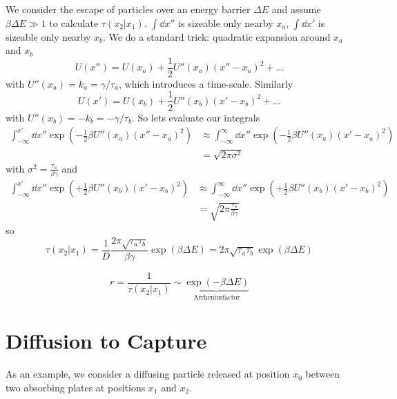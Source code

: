 \documentclass{notebook}
\begin{document}
We consider the escape of particles over an energy barrier $\Delta E$ and assume $\beta \Delta E \gg 1$ to calculate $\tau(x_2|x_1)$. $\int \dd{x''}$ is sizeable only nearby $x_a$, $\int \dd{x'}$ is sizeable only nearby $x_b$. We do a standard trick: quadratic expansion around $x_a$ and $x_b$
%
\begin{equation}
U(x'') = U(x_a) + \frac{1}{2} U''(x_a) (x''-x_a)^2 + \dots
\end{equation}
%
with $U''(x_a) = k_a = \gamma/\tau_a$, which introduces a time-scale. Similarly
%
\begin{equation}
U(x') = U(x_b) + \frac{1}{2} U''(x_b) (x'-x_b)^2 + \dots
\end{equation}
%
with $U''(x_b) = -k_b = -\gamma/\tau_b$. So lets evaluate our integrals
%
\begin{align*}
	\int_{-\infty}^{x'} \dd{x''} \exp(-  \frac{1}{2} \beta U''(x_a) (x''-x_a)^2)
	&\approx \int_{-\infty}^{\infty} \dd{x''} \exp(-  \frac{1}{2} \beta U''(x_a) (x'-x_a)^2) \\ 
	&= \sqrt{2 \pi \sigma^2}
\end{align*}
%
with $\sigma^2 = \frac{\tau_a}{\beta \gamma}$ and
%
\begin{align*}
	\int_{-\infty}^{x'} \dd{x''} \exp(+\frac{1}{2} \beta U''(x_b) (x'-x_b)^2)
	&\approx \int_{-\infty}^{\infty} \dd{x''} \exp(+\frac{1}{2} \beta U''(x_b) (x'-x_b)^2) \\ &= \sqrt{2 \pi \frac{\tau_b}{\beta \gamma}}
\end{align*}
%
so
%
\begin{equation}
\tau(x_2 | x_1) = \frac{1}{D} \frac{2 \pi \sqrt{\tau_a \tau_b}}{\beta \gamma} \exp(\beta \Delta E) = 2 \pi \sqrt{\tau_a \tau_b} \exp(\beta \Delta E)
\end{equation}
%
\begin{theorem}
	\begin{equation}
	r = \frac{1}{\tau(x_2 | x_1)} \sim \underbrace{\exp(-\beta \Delta E)}_{\mathrm{Arrhenius factor}}
	\end{equation}
\end{theorem}
%

\section{Diffusion to Capture}

As an example, we consider a diffusing particle released at position $x_0$ between two absorbing plates at positions $x_1$ and $x_2$. 
\end{document}
